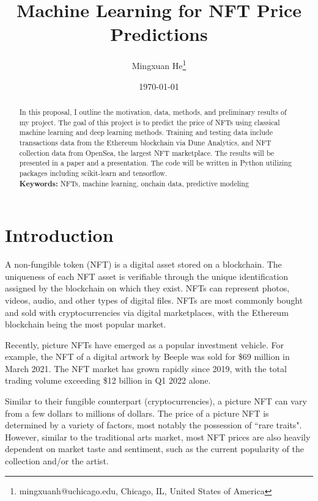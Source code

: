 \documentclass[12pt]{article}
\begin{document}
\title{Machine Learning for NFT Price Predictions}


\author{Mingxuan He\thanks{mingxuanh@uchicago.edu, Chicago, IL, United States of America}}
\date{\today}


\maketitle 


\begin{abstract}
In this proposal, I outline the motivation, data, methods, and preliminary results of my project. The goal of this project is to predict the price of NFTs using classical machine learning and deep learning methods. Training and testing data include transactions data from the Ethereum blockchain via Dune Analytics, and NFT collection data from OpenSea, the largest NFT marketplace. The results will be presented in a paper and a presentation. The code will be written in Python utilizing packages including scikit-learn and tensorflow.\\

\textbf{Keywords:} NFTs, machine learning, onchain data, predictive modeling

\end{abstract} 



\section{Introduction}
\label{sec: introduction}
A non-fungible token (NFT) is a digital asset stored on a blockchain. The uniqueness of each NFT asset is verifiable through the unique identification assigned by the blockchain on which they exist.
NFTs can represent photos, videos, audio, and other types of digital files. NFTs are most commonly bought and sold with cryptocurrencies via digital marketplaces, with the Ethereum blockchain being the most popular market.

Recently, picture NFTs have emerged as a popular investment vehicle. For example, the NFT of a digital artwork by Beeple was sold for \$69 million in March 2021. The NFT market has grown rapidly since 2019, with the total trading volume exceeding \$12 billion in Q1 2022 alone.

Similar to their fungible counterpart (cryptocurrencies), a picture NFT can vary from a few dollars to millions of dollars. The price of a picture NFT is determined by a variety of factors, most notably the possession of ``rare traits". However, similar to the traditional arts market, most NFT prices are also heavily dependent on market taste and sentiment, such as the current popularity of the collection and/or the artist.
\end{document}
